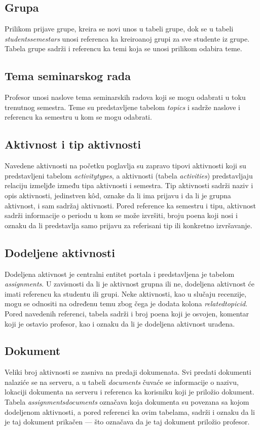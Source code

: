 \documentclass[12pt,oneside]{memoir}
\begin{document}
\subsection{Grupa}
Prilikom prijave grupe, kreira se novi unos u tabeli grupe, dok se u tabeli \emph{students{\textunderscore}semestars} unosi
referenca ka kreiroanoj grupi za sve studente iz grupe. Tabela grupe sadrži i referencu ka temi koja se unosi prilikom odabira teme.

\subsection{Tema seminarskog rada} 
Profesor unosi naslove tema seminarskih radova koji se mogu odabrati u toku trenutnog semestra. Teme su predstavljene tabelom \emph{topics} i sadrže naslove i referencu ka semestru u kom se mogu odabrati.

\subsection{Aktivnost i tip aktivnosti}
Navedene aktivnosti na početku poglavlja su zapravo tipovi aktivnosti koji su predstavljeni tabelom \emph{activity{\textunderscore}types},
a aktivnosti (tabela \emph{activities}) predstavljaju relaciju izmeljđe između tipa aktivnosti i semestra. 
Tip aktivnosti sadrži naziv i opis aktivnosti, jedinstven k\^{o}d, oznake da li ima prijavu i da li je grupna aktivnost, i sam sadržaj aktivnosti.
Pored reference ka semestru i tipu, aktivnost sadrži informacije o periodu u kom se može izvršiti, broju poena koji nosi i oznaku da li predstavlja
samo prijavu za referisani tip ili konkretno izvršavanje.

\subsection{Dodeljene aktivnosti}
Dodeljena aktivnost je centralni entitet portala i predstavljena je tabelom \emph{assignments}. U zavisnosti da li je aktivnost grupna ili ne, dodeljena aktivnost će imati referencu
ka studentu ili grupi. Neke aktivnosti, kao u slučaju recenzije, mogu se odnositi na određenu temu zbog čega je dodata kolona \emph{related{\textunderscore}topic{\textunderscore}id}. Pored
navedenih referenci, tabela sadrži i broj poena koji je osvojen, komentar koji je ostavio profesor, kao i oznaku da li je dodeljena aktivnost urađena. 

\subsection{Dokument}
Veliki broj aktivnosti se zasniva na predaji dokumenata. Svi predati dokumenti nalaziće se na serveru, a u tabeli \emph{documents} čuvaće se informacije o nazivu, lokaciji dokumenta
na serveru i referenca ka korisniku koji je priložio dokument. Tabela \emph{assignments{\textunderscore}documents} označava koja dokumenta su povezana sa kojom dodeljenom aktivnosti, a
pored referenci ka ovim tabelama, sadrži i oznaku da li je taj dokument prikačen --- što označava da je taj dokument priložio profesor.
\end{document}
